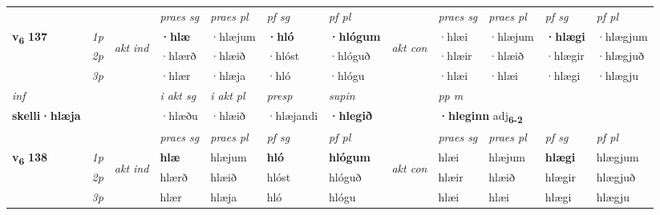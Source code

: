\begin{longtable}[l]{X>{\footnotesize\itshape}llXXXXlXXXX}
 & &   & \textit{praes sg}  & \textit{praes pl}    & \textit{ pf sg} & \textit{pf pl} & & \textit{praes sg}  & \textit{praes pl}    & \textit{pf sg} & \textit{pf pl }  \\ \cmidrule{4-7} \cmidrule{9-12}
 \multirow{2}{*}{{{\textbf{v{\textsubscript{6}}} \Large{\textbf{137}}}}}  & 1p & \multirow{3}{*}{\begin{turn}{90}\textit{akt ind}\end{turn}} & \textbf{·hlæ} & ·hlæjum & \textbf{·hló} & \textbf{·hlógum} & \multirow{3}{*}{\begin{turn}{90}\textit{akt con}\end{turn}} &·hlæi & ·hlæjum & \textbf{·hlægi} & ·hlægjum\\*
 & 2p &  &  ·hlærð  & ·hlæið & ·hlóst & ·hlóguð & & ·hlæir & ·hlæið & ·hlægir & ·hlægjuð \\*
 & 3p &  & ·hlær & ·hlæja & ·hló & ·hlógu & & ·hlæi & ·hlæi& ·hlægi & ·hlægju \\*
\cmidrule{4-7} \cmidrule{9-12}

   {\textit{inf}} & &  & \textit{i akt sg} & \textit{i akt pl}   & \textit{presp} & \textit{supin}  && \textit{pp m} \\*
  {\textbf{skelli\allowbreak ·hlæja}} & && ·hlæðu  & ·hlæið   & ·hlæjandi &  \textbf{·hlegið}  && \multicolumn{2}{l}{\textbf{·hleginn} adj\textbf{\textsubscript{6-2}}} \\*

\midrule

 & &   & \textit{praes sg}  & \textit{praes pl}    & \textit{ pf sg} & \textit{pf pl} & & \textit{praes sg}  & \textit{praes pl}    & \textit{pf sg} & \textit{pf pl }  \\ \cmidrule{4-7} \cmidrule{9-12}
 \multirow{2}{*}{{{\textbf{v{\textsubscript{6}}} \Large{\textbf{138}}}}}  & 1p & \multirow{3}{*}{\begin{turn}{90}\textit{akt ind}\end{turn}} & \textbf{hlæ} & hlæjum & \textbf{hló} & \textbf{hlógum} & \multirow{3}{*}{\begin{turn}{90}\textit{akt con}\end{turn}} &hlæi & hlæjum & \textbf{hlægi} & hlægjum\\*
 & 2p &  &  hlærð  & hlæið & hlóst & hlóguð & & hlæir & hlæið & hlægir & hlægjuð \\*
 & 3p &  & hlær & hlæja & hló & hlógu & & hlæi & hlæi& hlægi & hlægju \\*
\cmidrule{4-7} \cmidrule{9-12}


\end{longtable}
